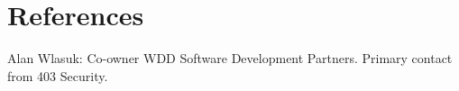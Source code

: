 \section{References}
\begin{description}
\item{Alan Wlasuk:}  Co-owner WDD Software Development Partners. Primary contact from 403 Security.
\end{description}